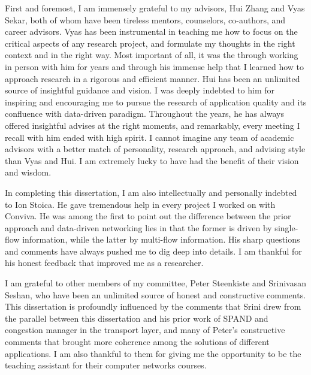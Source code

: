\documentclass[12pt]{ZHU-cmuthesis}
\begin{document}
\begin{acknowledgments}


First and foremost, I am immensely grateful to my advisors, Hui Zhang and Vyas Sekar,
both of whom have been tireless mentors, counselors, co-authors, and career advisors. 
Vyas has been instrumental in teaching me how to focus on the critical aspects of any research project, and formulate my thoughts in the right context and in the right way. Most important of all, it was the through working in person with him for years and through his immense help that I learned how to approach research in a rigorous and efficient manner. 
Hui has been an unlimited source of insightful guidance and vision. I was deeply indebted to him for inspiring and encouraging me to pursue the research of application quality and its confluence with data-driven paradigm. Throughout the years, he has always offered insightful advises at the right moments, and remarkably, every meeting I recall with him ended with high spirit.
I cannot imagine any team of academic advisors with a better match of personality, research approach, and advising style than Vyas and Hui. I am extremely lucky to have had the benefit of their vision and wisdom. 

%
In completing this dissertation, I am also intellectually and personally indebted to Ion Stoica. He gave tremendous help in every project I worked on with Conviva. 
He was among the first to point out the difference between the prior approach and data-driven networking lies in that the former is driven by single-flow information, while the latter by multi-flow information.
His sharp questions and comments have always pushed me to dig deep into details. 
I am thankful for his honest feedback that improved me as a researcher.

%
I am grateful to other members of my committee, Peter Steenkiste and Srinivasan Seshan, who have been an unlimited source of honest and constructive comments. This dissertation is profoundly  influenced by the comments that Srini drew from the parallel between this dissertation and his prior work of SPAND and congestion manager in the transport layer, and many of Peter's constructive comments that brought more coherence among the solutions of different applications.
I am also thankful to them for giving me the opportunity to be the teaching assistant for their computer networks courses.


\end{acknowledgments}
\end{document}
